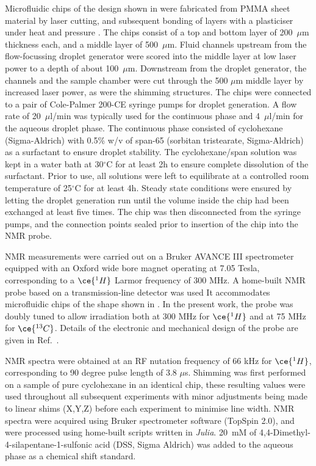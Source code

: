 Microfluidic chips of the design shown in 
were fabricated from PMMA sheet material by
laser cutting, and subsequent bonding of layers with a plasticiser
under heat and pressure \citep{Yilmaz:2016fx}. The chips consist of a
top and bottom layer of 200~$\mu$m thickness each, and a middle layer of
500~$\mu$m. Fluid channels upstream from the flow-focussing droplet
generator were scored into the middle layer at low laser power to a depth
of about 100~$\mu$m. Downstream from the droplet generator, the channels and
the sample chamber were cut through the 500 $\mu$m middle layer by increased
laser power, as were the shimming structures. The chips were connected to
a pair of Cole-Palmer 200-CE syringe pumps for droplet generation.
A flow rate of 20~$\mu$l/min was typically used for the continuous
phase and 4~$\mu$l/min for the aqueous droplet phase.
The continuous phase consisted of cyclohexane (Sigma-Aldrich)
with 0.5\% w/v of span-65 (sorbitan
tristearate, Sigma-Aldrich) as a surfactant to ensure droplet stability.
The cyclohexane/span solution was kept in a water bath at 30$^\circ$C
for at least 2h to ensure complete dissolution of the surfactant.
Prior to use, all solutions were left to equilibrate at a controlled room temperature
of 25$^\circ$C for at least 4h.
Steady state conditions were ensured by letting the droplet generation run until
the volume inside the chip had been exchanged at least five times. The
chip was then disconnected from the syringe pumps, and the connection
points sealed prior to insertion of the chip into the NMR probe.

NMR measurements were carried out on a Bruker AVANCE III
spectrometer equipped with an Oxford wide bore magnet operating at 7.05 Tesla,
corresponding to a $\ce{^1H}$ Larmor frequency of 300 MHz. A home-built NMR probe
based on a transmission-line detector was used \citep{Finch:2016gv}
It accommodates microfluidic chips of the shape shown in .
In the present work, the probe was doubly
tuned to allow irradiation both at 300 MHz for $\ce{^1H}$ and at 75 MHz for
$\ce{^{13}C}$. Details of the electronic and mechanical design of the
probe are given in Ref.~\citep{Finch:2017vb}.

NMR spectra were obtained at an RF nutation frequency of 66 kHz for
$\ce{^1H}$, corresponding to 90 degree pulse length of
3.8 $\mu$s. Shimming was first performed on a sample of pure cyclohexane
in an identical chip, these resulting values were used throughout all subsequent experiments with
minor adjustments being made to linear shims (X,Y,Z) before each experiment to minimise line width. NMR spectra were acquired using Bruker spectrometer software (TopSpin 2.0),
and were processed using home-built scripts written in \textit{Julia}. \citep{Bezanson:2017gd}
20~mM of 4,4-Dimethyl-4-silapentane-1-sulfonic acid (DSS, Sigma Aldrich) was added to the aqueous phase
as a chemical shift standard.

